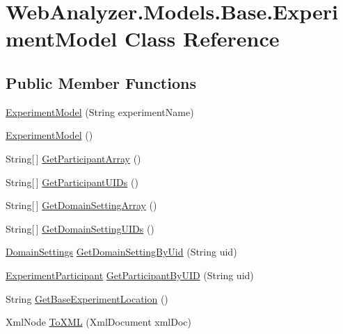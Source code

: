 \hypertarget{class_web_analyzer_1_1_models_1_1_base_1_1_experiment_model}{}\section{Web\+Analyzer.\+Models.\+Base.\+Experiment\+Model Class Reference}
\label{class_web_analyzer_1_1_models_1_1_base_1_1_experiment_model}
\subsection*{Public Member Functions}
\begin{DoxyCompactItemize}
\item 
\hyperlink{class_web_analyzer_1_1_models_1_1_base_1_1_experiment_model_a64aa31d07212ecda87fd557c051ea529}{Experiment\+Model} (String experiment\+Name)
\item 
\hyperlink{class_web_analyzer_1_1_models_1_1_base_1_1_experiment_model_a261ba587472913ad4f34f60c13ee3904}{Experiment\+Model} ()
\item 
String\mbox{[}$\,$\mbox{]} \hyperlink{class_web_analyzer_1_1_models_1_1_base_1_1_experiment_model_af7a368e96b98082d8b878222dbcac372}{Get\+Participant\+Array} ()
\item 
String\mbox{[}$\,$\mbox{]} \hyperlink{class_web_analyzer_1_1_models_1_1_base_1_1_experiment_model_a6199a670aff6e00209ed3fdaa7020ecd}{Get\+Participant\+U\+I\+Ds} ()
\item 
String\mbox{[}$\,$\mbox{]} \hyperlink{class_web_analyzer_1_1_models_1_1_base_1_1_experiment_model_abb3bdca255c65bedcd3e48c03b618dae}{Get\+Domain\+Setting\+Array} ()
\item 
String\mbox{[}$\,$\mbox{]} \hyperlink{class_web_analyzer_1_1_models_1_1_base_1_1_experiment_model_aadb028e75684f16bd92456a883bb1d6a}{Get\+Domain\+Setting\+U\+I\+Ds} ()
\item 
\hyperlink{class_web_analyzer_1_1_models_1_1_settings_model_1_1_domain_settings}{Domain\+Settings} \hyperlink{class_web_analyzer_1_1_models_1_1_base_1_1_experiment_model_a8054747fc8c5ff6a0cc2a7d0fed7a11e}{Get\+Domain\+Setting\+By\+Uid} (String uid)
\item 
\hyperlink{class_web_analyzer_1_1_models_1_1_base_1_1_experiment_participant}{Experiment\+Participant} \hyperlink{class_web_analyzer_1_1_models_1_1_base_1_1_experiment_model_a1598095ae1e7e07f44c91db79d751666}{Get\+Participant\+By\+U\+I\+D} (String uid)
\item 
String \hyperlink{class_web_analyzer_1_1_models_1_1_base_1_1_experiment_model_a113bb9a3b5a24817086eca3dd1320a5c}{Get\+Base\+Experiment\+Location} ()
\item 
Xml\+Node \hyperlink{class_web_analyzer_1_1_models_1_1_base_1_1_experiment_model_a28b8ebb68293b7ab351bcd5734c7960c}{To\+X\+M\+L} (Xml\+Document xml\+Doc)
\end{DoxyCompactItemize}

